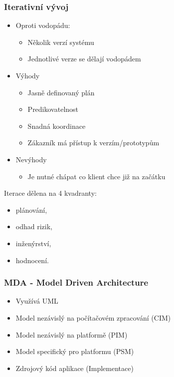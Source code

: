     \subsubsection{Iterativní vývoj}
      \begin{itemize}
        \item Oproti vodopádu:
          \begin{itemize}
            \item Několik verzí systému
            \item Jednotlivé verze se dělají vodopádem
          \end{itemize}
        \item Výhody
          \begin{itemize}
            \item Jasně definovaný plán
            \item Predikovatelnost
            \item Snadná koordinace
            \item Zákazník má přístup k verzím/prototypům
          \end{itemize}
        \item Nevýhody
          \begin{itemize}
            \item Je nutné chápat co klient chce již na začátku
          \end{itemize}
      \end{itemize}

        Iterace dělena na 4 kvadranty:
          \begin{itemize}
            \item plánování,
            \item odhad rizik,
            \item inženýrství,
            \item hodnocení.
          \end{itemize}

      \subsubsection{MDA - Model Driven Architecture}
        \begin{itemize}
          \item Využívá UML
          \item Model nezávislý na počítačovém zpracování (CIM)
          \item Model nezávislý na platformě (PIM)
          \item Model specifický pro platformu (PSM)
          \item Zdrojový kód aplikace (Implementace)
        \end{itemize}

